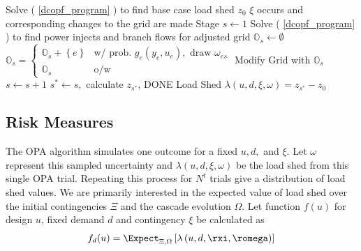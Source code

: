 \begin{algorithm}
\caption[OPA cascading algorithm simulating the evolution of the cascading process]{OPA cascading algorithm simulating the evolution of the cascading process governed by uncertainty space $\Omega$}\label{opa_alg}
\begin{algorithmic}
\State Solve ( \ref{dcopf_program} ) to find base case load shed $z_0$
\State $\xi$ occurs and corresponding changes to the grid are made
\State Stage $s \gets 1$
\State Solve ( \ref{dcopf_program} ) to find power injects and branch flows for adjusted grid
\State $\mathbb{O}_s \gets \emptyset$
\State $\mathbb{O}_s = 
\left\{ 
\begin{array}{lr}
  \mathbb{O}_s + \left\{ e \right\} & \mbox{w/ prob. } g_e(y_e,u_e), \mbox{ draw } \omega_{es} \\
  \mathbb{O}_s & \mbox{o/w }
\end{array}
\right. $ 
\EndFor
{}
\State Modify Grid with $\mathbb{O}_s$
\State $s\gets s+1$
\Else
\State $s^* \gets s,$ calculate $z_{s^*}$, DONE
\EndIf
\EndWhile
\State \label{done}Load Shed $  \lambda\left(u,d,\xi,\omega\right)  = z_{s^*} - z_0$
\EndProcedure
\end{algorithmic}
\end{algorithm}

\subsection{Risk Measures}\label{riskmeasures}
The OPA algorithm simulates one outcome for a fixed $u, d,$ and $\xi$.  Let $\omega$ represent this sampled uncertainty and $\lambda\left(u,d,\xi,\omega\right)$ be the load shed from this single OPA trial.  Repeating this process for $N^t$ trials give a distribution of load shed values.  We are primarily interested in the expected value of load shed over the initial contingencies $\Xi$ and the cascade evolution $\Omega$.  Let function $f (u) $  for design $u$, fixed demand $d$ and contingency $\xi$ be calculated as 
\begin{equation}
f_d(u) = \Expect_{\Xi,\Omega} \left[  \lambda\left(u,d,\rxi,\romega\right)  \right]
\end{equation}

